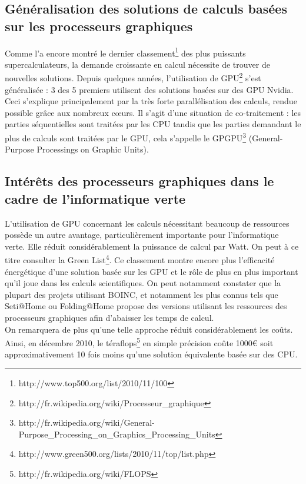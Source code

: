 \documentclass[a4paper,11pt,french]{article}
\begin{document}
\subsection{Généralisation des solutions de calculs basées sur les processeurs graphiques}
Comme l’a encore montré le dernier classement\footnote{\textsf{http://www.top500.org/list/2010/11/100}} des plus puissants supercalculateurs, la demande croissante en calcul nécessite de trouver de nouvelles solutions. Depuis quelques années, l’utilisation de GPU\footnote{\textsf{http://fr.wikipedia.org/wiki/Processeur\_{}graphique}} s’est généralisée : 3 des 5 premiers utilisent des solutions basées sur des GPU Nvidia. Ceci s’explique principalement par la très forte parallélisation des calculs, rendue possible grâce aux nombreux cœurs. Il s’agit d’une situation de co-traitement : les parties séquentielles sont traitées par les CPU tandis que les parties demandant le plus de calculs sont traitées par le GPU, cela s’appelle le GPGPU\footnote{\textsf{http://fr.wikipedia.org/wiki/General-Purpose\_{}Processing\_{}on\_{}Graphics\_{}Processing\_{}Units}} (General-Purpose Processings on Graphic Units).\\

\subsection{Intérêts des processeurs graphiques dans le cadre de l'informatique verte}
L'utilisation de GPU concernant les calculs nécessitant beaucoup de ressources possède un autre avantage, particulièrement importante pour l'informatique verte. Elle réduit considérablement la puissance de calcul par Watt. On peut à ce titre consulter la Green List\footnote{\textsf{http://www.green500.org/lists/2010/11/top/list.php}}. Ce classement montre encore plus l’efficacité énergétique d’une solution basée sur les GPU et le rôle de plus en plus important qu'il joue dans les calculs scientifiques. On peut notamment constater que la plupart des projets utilisant BOINC, et notamment les plus connus tels que Seti@Home ou Folding@Home propose des versions utilisant les ressources des processeurs graphiques afin d'abaisser les temps de calcul.\\

On remarquera de plus qu’une telle approche réduit considérablement les coûts. Ainsi, en décembre 2010, le téraflops\footnote{\textsf{http://fr.wikipedia.org/wiki/FLOPS}} en simple précision coûte 1000\euro{}  soit approximativement 10 fois moins qu’une solution équivalente basée sur des CPU.\\
\end{document}
